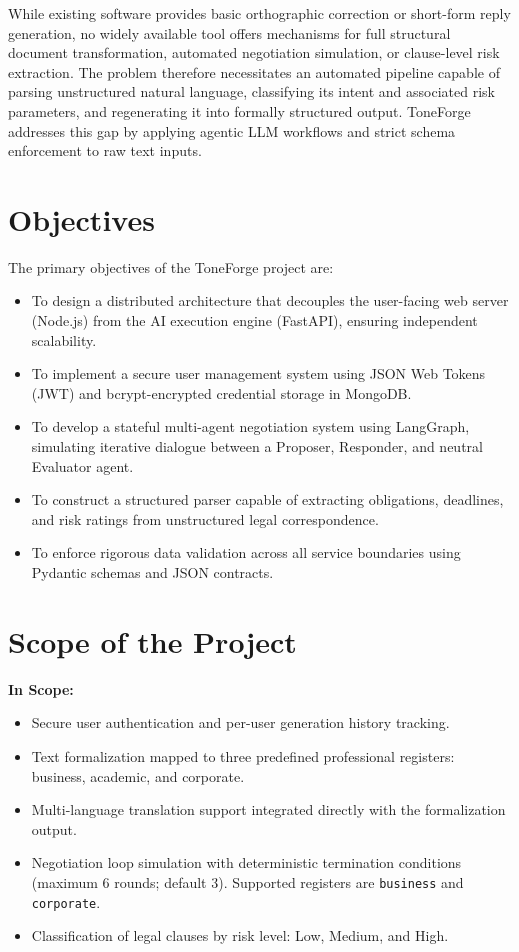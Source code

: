 \documentclass[12pt,a4paper]{report}
\begin{document}
While existing software provides basic orthographic correction or short-form reply generation, no widely available tool offers mechanisms for full structural document transformation, automated negotiation simulation, or clause-level risk extraction. The problem therefore necessitates an automated pipeline capable of parsing unstructured natural language, classifying its intent and associated risk parameters, and regenerating it into formally structured output. ToneForge addresses this gap by applying agentic LLM workflows and strict schema enforcement to raw text inputs.

\section{Objectives}
The primary objectives of the ToneForge project are:
\begin{itemize}
	\item To design a distributed architecture that decouples the user-facing web server (Node.js) from the AI execution engine (FastAPI), ensuring independent scalability.
	\item To implement a secure user management system using JSON Web Tokens (JWT) and bcrypt-encrypted credential storage in MongoDB.
	\item To develop a stateful multi-agent negotiation system using LangGraph, simulating iterative dialogue between a Proposer, Responder, and neutral Evaluator agent.
	\item To construct a structured parser capable of extracting obligations, deadlines, and risk ratings from unstructured legal correspondence.
	\item To enforce rigorous data validation across all service boundaries using Pydantic schemas and JSON contracts.
\end{itemize}

\section{Scope of the Project}

\noindent\textbf{In Scope:}
\begin{itemize}
	\item Secure user authentication and per-user generation history tracking.
	\item Text formalization mapped to three predefined professional registers: business, academic, and corporate.
	\item Multi-language translation support integrated directly with the formalization output.
	\item Negotiation loop simulation with deterministic termination conditions (maximum 6 rounds; default 3). Supported registers are \texttt{business} and \texttt{corporate}.
	\item Classification of legal clauses by risk level: Low, Medium, and High.
\end{itemize}
\end{document}
